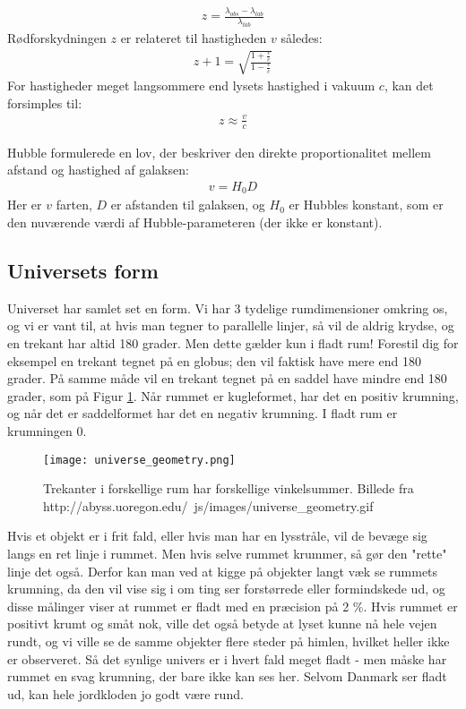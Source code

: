 \documentclass[a4paper]{article}
\begin{document}
\begin{align}
	z=\frac{\lambda_{obs}-\lambda_{lab}}{\lambda_{lab}}
\end{align}
Rødforskydningen $z$ er relateret til hastigheden $v$ således:
\begin{align}
	z+1=\sqrt{\frac{1+\frac{v}{c}}{1-\frac{v}{c}}}
\end{align}
For hastigheder meget langsommere end lysets hastighed i vakuum $c$, kan det forsimples til:
\begin{align}
	z\approx\frac{v}{c}
\end{align}

Hubble formulerede en lov, der beskriver den direkte proportionalitet mellem afstand og hastighed af galaksen:
\begin{align}
	v=H_0 D
\end{align}
Her er $v$ farten, $D$ er afstanden til galaksen, og $H_0$ er Hubbles konstant, som er den nuværende værdi af Hubble-parameteren (der ikke er konstant).
 
 


\subsection{Universets form}

Universet har samlet set en form. Vi har 3 tydelige rumdimensioner omkring os, og vi er vant til, at hvis man tegner to parallelle linjer, så vil de aldrig krydse, og en trekant har altid 180 grader. Men dette gælder kun i fladt rum! Forestil dig for eksempel en trekant tegnet på en globus; den vil faktisk have mere end 180 grader. På samme måde vil en trekant tegnet på en saddel have mindre end 180 grader, som på Figur \ref{shapes}. Når rummet er kugleformet, har det en positiv krumning, og når det er saddelformet har det en negativ krumning. I fladt rum er krumningen 0.

\begin{figure}[H]
\centering
\texttt{[image: universe\_geometry.png]}
\caption{Trekanter i forskellige rum har forskellige vinkelsummer. Billede fra http://abyss.uoregon.edu/~js/images/universe\_geometry.gif}
\label{shapes}
\end{figure}

Hvis et objekt er i frit fald, eller hvis man har en lysstråle, vil de bevæge sig langs en ret linje i rummet. Men hvis selve rummet krummer, så gør den "rette" linje det også. Derfor kan man ved at kigge på objekter langt væk se rummets krumning, da den vil vise sig i om ting ser forstørrede eller formindskede ud, og disse målinger viser at rummet er fladt med en præcision på 2 \%. %
Hvis rummet er positivt krumt og småt nok, ville det også betyde at lyset kunne nå hele vejen rundt, og vi ville se de samme objekter flere steder på himlen, hvilket heller ikke er observeret. Så det synlige univers er i hvert fald meget fladt - men måske har rummet en svag krumning, der bare ikke kan ses her. Selvom Danmark ser fladt ud, kan hele jordkloden jo godt være rund.
\end{document}
